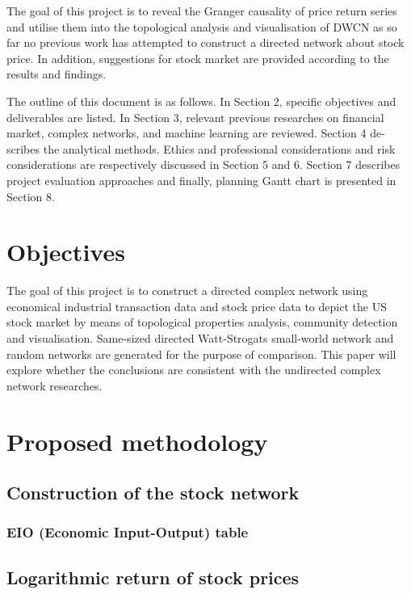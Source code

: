 
The goal of this project is to reveal the Granger causality of price return series and utilise them into the topological analysis and visualisation of DWCN as so far no previous work has attempted to construct a directed network about stock price. In addition, suggestions for stock market are provided according to the results and findings.

The outline of this document is as follows. In Section 2, specific objectives and deliverables are listed. In Section 3, relevant previous researches on financial market, complex networks, and machine learning are reviewed. Section 4 de- scribes the analytical methods. Ethics and professional considerations and risk considerations are respectively discussed in Section 5 and 6. Section 7 describes project evaluation approaches and finally, planning Gantt chart is presented in Section 8.


\section{Objectives}
The goal of this project is to construct a directed complex network using economical industrial transaction data and stock price data to depict the US stock market by means of topological properties analysis, community detection and visualisation. Same-sized directed Watt-Strogats small-world network and random networks are generated for the purpose of comparison. This paper will explore whether the conclusions are consistent with the undirected complex network researches.

\section{Proposed methodology}
\subsection{Construction of the stock network}
\subsubsection{EIO (Economic Input-Output) table}


\subsection{Logarithmic return of stock prices}

